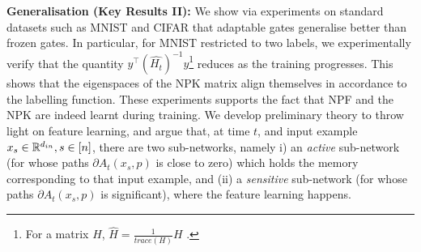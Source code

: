 \documentclass{article}
\begin{document}


\textbf{Generalisation (Key Results II):} We show via experiments on standard datasets such as MNIST and CIFAR that adaptable gates generalise better than frozen gates. In particular, for MNIST restricted to two labels, we experimentally verify that the quantity $y^\top (\widehat{H_t})^{-1}y$\footnote{For a matrix $H$, $\hat{H}=\frac{1}{trace(H)}H$ .} reduces as the training progresses. This shows that the eigenspaces of the NPK matrix align themselves in accordance to the labelling function. These experiments supports the fact that NPF and the NPK are indeed learnt during training. We develop preliminary theory to throw light on feature learning, and argue that, at time $t$, and input example $x_s\in \mathbb{R}^{d_{in}},s\in[n]$, there are two sub-networks, namely i) an \emph{active} sub-network (for whose paths $\partial A_t(x_s,p)$ is close to zero) which holds the memory corresponding to that input example, and (ii) a \emph{sensitive} sub-network (for whose paths $\partial A_t(x_s,p)$ is significant), where the feature learning happens.


\end{document}
